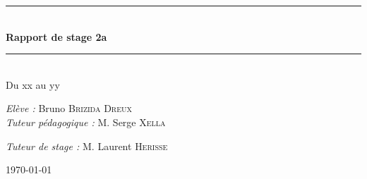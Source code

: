 \begin{titlepage}
\begin{center}


\vspace{2cm}
\hrule  ~\\[0.4cm]
{ \huge \bfseries Rapport de stage 2a}\\[0.4cm]

\hrule  ~\\[1.5cm]
\large Du xx au yy

\vspace{4cm}
\large\emph{Elève :} Bruno \textsc{Brizida Dreux} ~\\
\vspace{0.5cm}
\large\emph{Tuteur pédagogique :} M. Serge \textsc{Xella}

\large\emph{Tuteur de stage :} M. Laurent \textsc{Herisse}




\vfill

{\large\today}

\end{center}

\end{titlepage}
